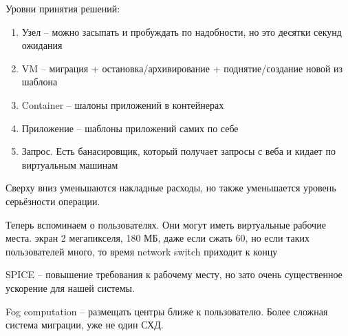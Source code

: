 \documentclass{book}
\theoremstyle{definition}
\begin{document}
Уровни принятия решений:
\begin{enumerate}
    \item Узел -- можно засыпать и пробуждать по надобности, но это десятки секунд ожидания
    \item VM -- миграция + остановка/архивирование + поднятие/создание новой из шаблона
    \item Container -- шалоны приложений в контейнерах
    \item Приложение -- шаблоны приложений самих по себе
    \item Запрос. Есть банасировщик, который получает запросы с веба и кидает по виртуальным машинам
\end{enumerate}

Сверху вниз уменьшаются накладные расходы, но также уменьшается уровень серьёзности операции.

Теперь вспоминаем о пользователях. Они могут иметь виртуальные рабочие места. экран 2 мегапикселя, 180 МБ, даже если сжать 60, но если таких пользователей много, то время network switch приходит к концу

SPICE -- повышение требования к рабочему месту, но зато очень существенное ускорение для нашей системы.

Fog computation -- размещать центры ближе к пользователю. Более сложная система миграции, уже не один СХД.
\end{document}

